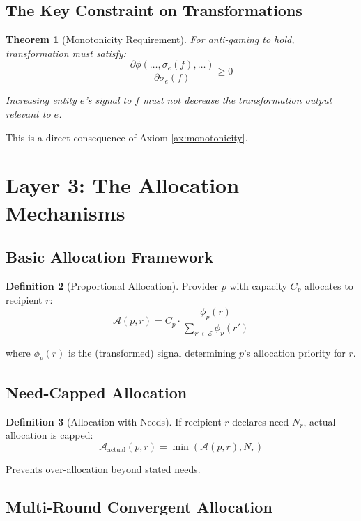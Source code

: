 \documentclass[11pt,a4paper]{article}
\newtheorem{theorem}{Theorem}[section]
\theoremstyle{definition}
\newtheorem{definition}[theorem]{Definition}
\theoremstyle{remark}
\newcommand{\E}{\mathcal{E}}
\newcommand{\A}{\mathcal{A}}
\begin{document}
\subsection{The Key Constraint on Transformations}

\begin{theorem}[Monotonicity Requirement]
For anti-gaming to hold, transformation must satisfy:
\[ \frac{\partial \phi(\ldots, \sigma_e(f), \ldots)}{\partial \sigma_e(f)} \ge 0 \]

Increasing entity $e$'s signal to $f$ must not decrease the transformation output relevant to $e$.
\end{theorem}

This is a direct consequence of Axiom \ref{ax:monotonicity}.

\section{Layer 3: The Allocation Mechanisms}

\subsection{Basic Allocation Framework}

\begin{definition}[Proportional Allocation]
Provider $p$ with capacity $C_p$ allocates to recipient $r$:
\[ \A(p,r) = C_p \cdot \frac{\phi_p(r)}{\sum_{r' \in \E} \phi_p(r')} \]

where $\phi_p(r)$ is the (transformed) signal determining $p$'s allocation priority for $r$.
\end{definition}

\subsection{Need-Capped Allocation}

\begin{definition}[Allocation with Needs]
If recipient $r$ declares need $N_r$, actual allocation is capped:
\[ \A_{\text{actual}}(p,r) = \min(\A(p,r), N_r) \]

Prevents over-allocation beyond stated needs.
\end{definition}

\subsection{Multi-Round Convergent Allocation}
\end{document}
